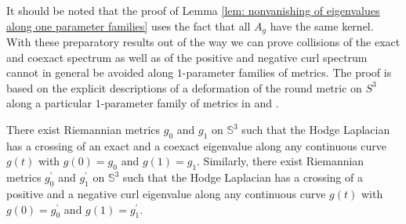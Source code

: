 It should be noted that the proof of Lemma \ref{lem: nonvanishing of eigenvalues along one parameter families} uses the fact that all $A_g$ have the same kernel. With these preparatory results out of the way we can prove collisions of the exact and coexact spectrum as well as of the positive and negative curl spectrum cannot in general be avoided along $1$-parameter families of metrics. The proof is based on the explicit descriptions of a deformation of the round metric on $S^3$ along a particular $1$-parameter family of metrics in \cite{Tanno1979LaplacianFunctions} and \cite{Tanno1983}.


\begin{proposition}\label{proposition:example of nonsimple families}
   There exist Riemannian metrics $g_0$ and $g_1$ on $\mathbb{S}^3$ such that the Hodge Laplacian has a crossing of an exact and a coexact eigenvalue along any continuous curve $g(t)$ with $g(0)=g_0$ and $g(1)=g_1$. Similarly, there exist Riemannian metrics $g_0^\prime$ and $g_1^\prime$ on $\mathbb S^3$ such that the Hodge Laplacian has a crossing of a positive and a negative curl eigenvalue along any continuous curve $g(t)$ with $g(0)=g_0^\prime$ and $g(1)=g_1^\prime$.
\end{proposition}



